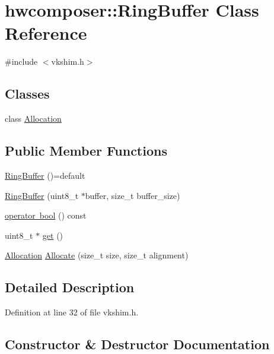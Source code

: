 \hypertarget{classhwcomposer_1_1RingBuffer}{}\section{hwcomposer\+:\+:Ring\+Buffer Class Reference}
\label{classhwcomposer_1_1RingBuffer}


{\ttfamily \#include $<$vkshim.\+h$>$}

\subsection*{Classes}
\begin{DoxyCompactItemize}
\item 
class \mbox{\hyperlink{classhwcomposer_1_1RingBuffer_1_1Allocation}{Allocation}}
\end{DoxyCompactItemize}
\subsection*{Public Member Functions}
\begin{DoxyCompactItemize}
\item 
\mbox{\hyperlink{classhwcomposer_1_1RingBuffer_aaec33c03d9c61161854cf51e05d612df}{Ring\+Buffer}} ()=default
\item 
\mbox{\hyperlink{classhwcomposer_1_1RingBuffer_ab061e580f8eb6807df66e87d25a54d02}{Ring\+Buffer}} (uint8\+\_\+t $\ast$buffer, size\+\_\+t buffer\+\_\+size)
\item 
\mbox{\hyperlink{classhwcomposer_1_1RingBuffer_a1273d3e06df05cddc6e306472d2cb717}{operator bool}} () const
\item 
uint8\+\_\+t $\ast$ \mbox{\hyperlink{classhwcomposer_1_1RingBuffer_ae5ac665cda663c5e34f2c43428ea1502}{get}} ()
\item 
\mbox{\hyperlink{classhwcomposer_1_1RingBuffer_1_1Allocation}{Allocation}} \mbox{\hyperlink{classhwcomposer_1_1RingBuffer_a8f9de6a65b9891573d5fc9fdda37b417}{Allocate}} (size\+\_\+t size, size\+\_\+t alignment)
\end{DoxyCompactItemize}


\subsection{Detailed Description}


Definition at line 32 of file vkshim.\+h.



\subsection{Constructor \& Destructor Documentation}
\mbox{\label{classhwcomposer_1_1RingBuffer_aaec33c03d9c61161854cf51e05d612df}} 
